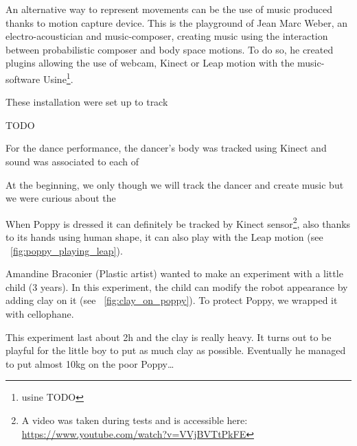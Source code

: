 An alternative way to represent movements can be the use of music produced thanks to motion capture device. This is the playground of Jean Marc Weber, an electro-acoustician and music-composer, creating music using the interaction between probabilistic composer and body space motions. To do so, he created plugins allowing the use of webcam, Kinect or Leap motion with the music-software Usine\footnote{usine TODO}.

These installation were set up to track

TODO

For the dance performance, the dancer's body was tracked using Kinect and sound was associated to each of

At the beginning, we only though we will track the dancer and create music but we were curious about the

When Poppy is dressed it can definitely be tracked by Kinect sensor\footnote{A video was taken during tests and is accessible here: \url{https://www.youtube.com/watch?v=VVjBVTtPkFE}}, also thanks to its hands using human shape, it can also play with the Leap motion (see \figurename~\ref{fig:poppy_playing_leap}).

\begin{NFfigure}
\centering
    \hfil
    \caption{}
    \label{fig:}
\end{NFfigure}

Amandine Braconier (Plastic artist) wanted to make an experiment with a little child (3 years). In this experiment, the child can modify the robot appearance by adding clay on it (see \figurename~\ref{fig:clay_on_poppy}). To protect Poppy, we wrapped it with cellophane.

This experiment last about 2h and the clay is really heavy. It turns out to be playful for the little boy to put as much clay as possible. Eventually he managed to put almost 10kg on the poor Poppy\dots

\begin{NFfigure}
\centering
    \hfil
    \caption{}
    \label{fig:clay_on_poppy}
\end{NFfigure}


